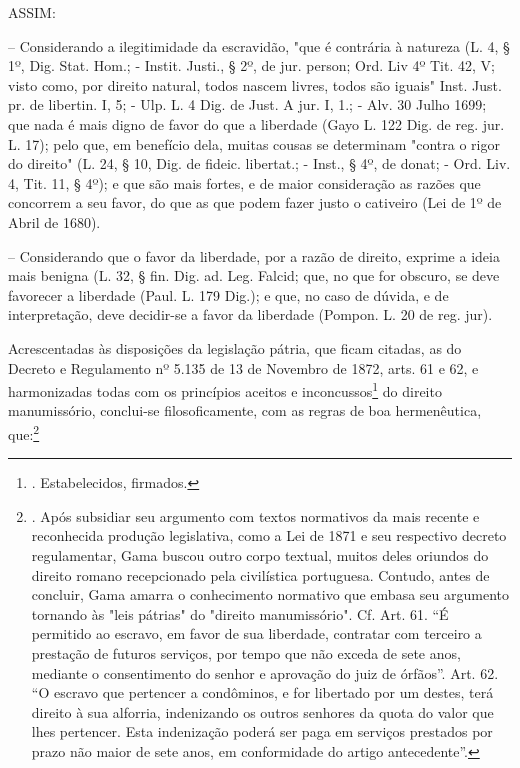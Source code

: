 ASSIM:

-- Considerando a ilegitimidade da escravidão, "que é contrária à
natureza (L. 4, § 1º, Dig. Stat. Hom.; - Instit. Justi., § 2º, de jur.
person; Ord. Liv 4º Tit. 42, V; visto como, por direito natural, todos
nascem livres, todos são iguais" Inst. Just. pr. de libertin. I, 5; -
Ulp. L. 4 Dig. de Just. A jur. I, 1.; - Alv. 30 Julho 1699; que nada é
mais digno de favor do que a liberdade (Gayo L. 122 Dig. de reg. jur. L.
17); pelo que, em benefício dela, muitas cousas se determinam "contra o
rigor do direito" (L. 24, § 10, Dig. de fideic. libertat.; - Inst., §
4º, de donat; - Ord. Liv. 4, Tit. 11, § 4º); e que são mais fortes, e de
maior consideração as razões que concorrem a seu favor, do que as que
podem fazer justo o cativeiro (Lei de 1º de Abril de 1680).

-- Considerando que o favor da liberdade, por a razão de direito,
exprime a ideia mais benigna (L. 32, § fin. Dig. ad. Leg. Falcid; que,
no que for obscuro, se deve favorecer a liberdade (Paul. L. 179 Dig.); e
que, no caso de dúvida, e de interpretação, deve decidir-se a favor da
liberdade (Pompon. L. 20 de reg. jur).

Acrescentadas às disposições da legislação pátria, que ficam citadas, as
do Decreto e Regulamento nº 5.135 de 13 de Novembro de 1872, arts. 61 e
62, e harmonizadas todas com os princípios aceitos e
inconcussos\footnote{. Estabelecidos, firmados.} do direito
manumissório, conclui-se filosoficamente, com as regras de boa
hermenêutica, que:\footnote{. Após subsidiar seu argumento com textos
  normativos da mais recente e reconhecida produção legislativa, como a
  Lei de 1871 e seu respectivo decreto regulamentar, Gama buscou outro
  corpo textual, muitos deles oriundos do direito romano recepcionado
  pela civilística portuguesa. Contudo, antes de concluir, Gama amarra o
  conhecimento normativo que embasa seu argumento tornando às "leis
  pátrias" do "direito manumissório". Cf. Art. 61. ``É permitido ao
  escravo, em favor de sua liberdade, contratar com terceiro a prestação
  de futuros serviços, por tempo que não exceda de sete anos, mediante o
  consentimento do senhor e aprovação do juiz de órfãos''. Art. 62. ``O
  escravo que pertencer a condôminos, e for libertado por um destes,
  terá direito à sua alforria, indenizando os outros senhores da quota
  do valor que lhes pertencer. Esta indenização poderá ser paga em
  serviços prestados por prazo não maior de sete anos, em conformidade
  do artigo antecedente''.}

